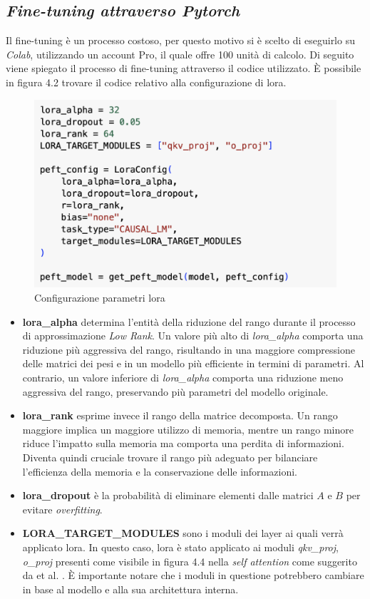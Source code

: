     \subsection{\textit{Fine-tuning attraverso Pytorch}}
     Il \gls{fine-tuning} è un processo costoso, per questo motivo si è scelto di eseguirlo su \textit{Colab}, utilizzando un account Pro, il quale offre 100 unità di calcolo. Di seguito viene spiegato il processo di \gls{fine-tuning} attraverso il codice utilizzato.
     È possibile in figura 4.2 trovare il codice relativo alla configurazione di \gls{lora}.
    \begin{figure}[!h]
        \centering        
        \includegraphics[width=12cm]{img/codiceLoRA.pdf}
        \caption{Configurazione parametri \gls{lora}}
    \end{figure}\newline
\begin{itemize}
    \item \textbf{lora\_alpha} determina l'entità della riduzione del rango durante il processo di approssimazione \textit{Low Rank}. Un valore più alto di \textit{lora\_alpha} comporta una riduzione più aggressiva del rango, risultando in una maggiore compressione delle matrici dei pesi e in un modello più efficiente in termini di parametri. Al contrario, un valore inferiore di \textit{lora\_alpha} comporta una riduzione meno aggressiva del rango, preservando più parametri del modello originale.
    \item \textbf{lora\_rank} esprime invece il rango della matrice decomposta. Un rango maggiore implica un maggiore utilizzo di memoria, mentre un rango minore riduce l'impatto sulla memoria ma comporta una perdita di informazioni. Diventa quindi cruciale trovare il rango più adeguato per bilanciare l'efficienza della memoria e la conservazione delle informazioni.
    \item \textbf{lora\_dropout} è la probabilità di eliminare elementi dalle matrici $A $ e $B$ per evitare \textit{overfitting}.
    \item \textbf{LORA\_TARGET\_MODULES} sono i moduli dei layer ai quali verrà applicato \gls{lora}. In questo caso, \gls{lora} è stato applicato ai moduli \textit{qkv\_proj}, \textit{o\_proj} presenti come visibile in figura 4.4 nella \textit{self attention} come suggerito da et al. \cite{article:Hu2021LoRALA} .
    È importante notare che i moduli in questione potrebbero cambiare in base al modello e alla sua architettura interna.
    \end{itemize}

